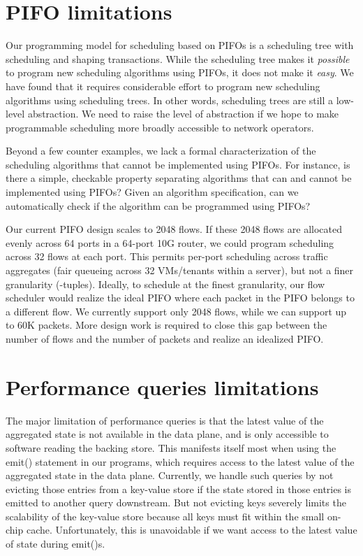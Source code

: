 \section{PIFO limitations}
\label{sec:pifo_limitations}

Our programming model for scheduling based on PIFOs is a scheduling tree with
scheduling and shaping transactions. While the scheduling tree makes it
\textit{possible} to program new scheduling algorithms using PIFOs, it does not
make it \textit{easy}. We have found that it requires considerable effort to
program new scheduling algorithms using scheduling trees.  In other words,
scheduling trees are still a low-level abstraction. We need to raise the level
of abstraction if we hope to make programmable scheduling more broadly
accessible to network operators.

Beyond a few counter examples, we lack a formal characterization of the
scheduling algorithms that cannot be implemented using PIFOs. For instance, is
there a simple, checkable property separating algorithms that can and cannot be
implemented using PIFOs? Given an algorithm specification, can we automatically
check if the algorithm can be programmed using PIFOs?

Our current PIFO design scales to 2048 flows. If these 2048 flows are allocated
evenly across 64 ports in a 64-port 10G router, we could program scheduling
across 32 flows at each port. This permits per-port scheduling across traffic
aggregates (\eg fair queueing across 32 VMs/tenants within a server), but not
a finer granularity (-tuples). Ideally, to schedule at the finest
granularity, our flow scheduler would realize the ideal PIFO where each packet
in the PIFO belongs to a different flow. We currently support only 2048 flows,
while we can support up to 60K packets.  More design work is required to close
this gap between the number of flows and the number of packets and realize an
idealized PIFO.

\section{Performance queries limitations}
\label{sec:pq_limitations}

The major limitation of performance queries is that the latest value of the
aggregated state is not available in the data plane, and is only accessible to
software reading the backing store. This manifests itself most when using the
{\ct emit()} statement in our programs, which requires access to the latest value of the
aggregated state in the data plane. Currently, we handle such queries by not
evicting those entries from a key-value store if the state stored in those
entries is emitted to another query downstream. But not evicting keys severely
limits the scalability of the key-value store because all keys must fit within
the small on-chip cache. Unfortunately, this is unavoidable if we want access to the latest
value of state during {\ct emit()}s.

